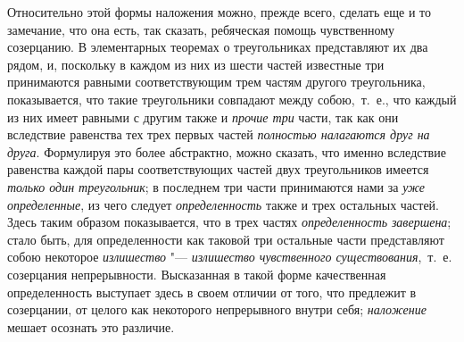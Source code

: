 Относительно этой формы наложения можно, прежде всего, сделать еще и то
замечание, что она есть, так сказать, ребяческая помощь чувственному
созерцанию. В элементарных теоремах о треугольниках представляют их два
рядом, и, поскольку в каждом из них из шести частей известные три
принимаются равными соответствующим трем частям другого треугольника,
показывается, что такие треугольники совпадают между собою,~т.~е., что
каждый из них имеет равными с другим также и
{\em прочие три} части, так как они вследствие
равенства тех трех первых частей {\em полностью
налагаются друг на друга}. Формулируя это более абстрактно, можно сказать,
что именно вследствие равенства каждой пары соответствующих частей двух
треугольников имеется {\em только один треугольник}; в
последнем три части принимаются нами за {\em уже
определенные}, из чего следует {\em определенность}
также и трех остальных частей. Здесь таким образом показывается, что в трех
частях {\em определенность}
{\em завершена}; стало быть, для определенности как
таковой три остальные части представляют собою некоторое
{\em излишество} "--- {\em излишество
чувственного существования},~т.~е. созерцания непрерывности. Высказанная в
такой форме качественная определенность выступает здесь в своем отличии от
того, что предлежит в созерцании, от целого как некоторого непрерывного
внутри себя; {\em наложение} мешает осознать это
различие.


